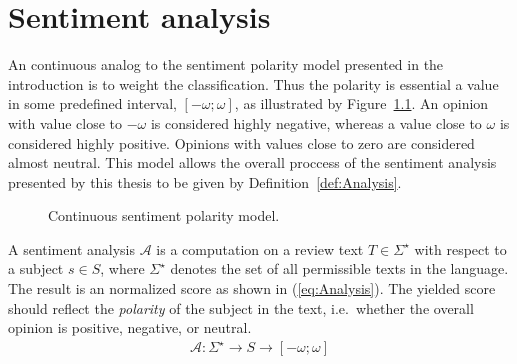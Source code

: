 
\chapter{Sentiment analysis}
\label{chap:sentimentAnalysis}

An continuous analog to the sentiment polarity model presented in the introduction is to weight the classification. Thus the polarity is essential a value in some predefined interval, $[-\omega; \omega]$, as illustrated by Figure~\ref{fig:continuousPolarity}. An opinion with value close to $-\omega$ is considered highly negative, whereas a value close to $\omega$ is considered highly positive. Opinions with values close to zero are considered almost neutral. This model allows the overall proccess of the sentiment analysis presented by this thesis to be given by Definition~\ref{def:Analysis}.
\begin{figure}[ht]
\begin{center}
\end{center}
\vspace{-1em}
\caption{Continuous sentiment polarity model.}
\label{fig:continuousPolarity}
\end{figure}

\begin{definition}
A sentiment analysis $\mathcal{A}$ is a computation on a review text $T \in \Sigma^\star$ with respect to a subject $s \in S$, where $\Sigma^\star$ denotes the set of all permissible texts in the language. The result is an normalized score as shown in (\ref{eq:Analysis}). The yielded score should reflect the \emph{polarity} of the subject in the text, i.e.\ whether the overall opinion is positive, negative, or neutral.
  \begin{align}
	 \mathcal{A}: \Sigma^\star \to S \to [-\omega;\omega]
	 \label{eq:Analysis}
  \end{align}
  \label{def:Analysis}
  \done
\end{definition}

